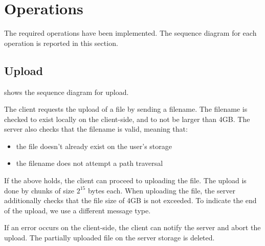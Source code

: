 \newpage
\section{Operations}
The required operations have been implemented. The sequence diagram for each operation is reported in this section.

\subsection{Upload}
 shows the sequence diagram for upload.

The client requests the upload of a file by sending a filename. The filename is checked to exist locally on the client-side, and to not be larger than 4GB. The server also checks that the filename is valid, meaning that:
\begin{itemize}
    \item the file doesn't already exist on the user's storage
    \item the filename does not attempt a path traversal
\end{itemize}
If the above holds, the client can proceed to uploading the file. The upload is done by chunks of size $2^{15}$ bytes each. When uploading the file, the server additionally checks that the file size of 4GB is not exceeded.
To indicate the end of the upload, we use a different message type.

If an error occurs on the client-side, the client can notify the server and abort the upload. The partially uploaded file on the server storage is deleted.

